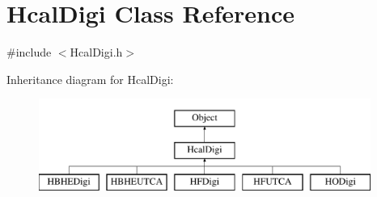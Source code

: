 \hypertarget{class_hcal_digi}{}\section{Hcal\+Digi Class Reference}
\label{class_hcal_digi}


{\ttfamily \#include $<$Hcal\+Digi.\+h$>$}

Inheritance diagram for Hcal\+Digi\+:\begin{figure}[H]
\begin{center}
\leavevmode
\includegraphics[height=3.000000cm]{class_hcal_digi}
\end{center}
\end{figure}
